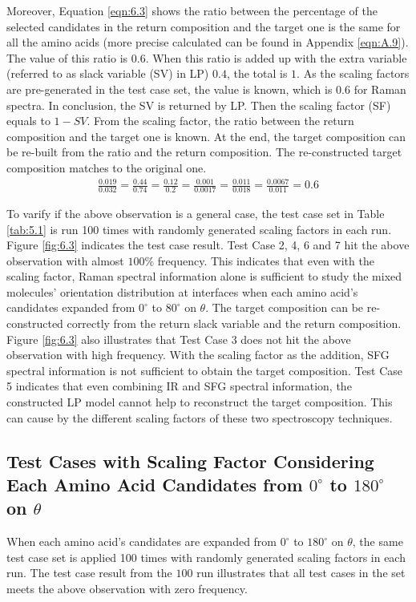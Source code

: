 Moreover, Equation \ref{eqn:6.3} shows the ratio between the percentage of the selected candidates in the return composition and the target one is the same for all the amino acids (more precise calculated can be found in Appendix \ref{eqn:A.9}). The value of this ratio is $0.6$. When this ratio is added up with the extra variable (referred to as slack variable (SV) in LP) $0.4$, the total is $1$. As the scaling factors are pre-generated in the test case set, the value is known, which is $0.6$ for Raman spectra. In conclusion, the SV is returned by LP. Then the scaling factor (SF) equals to $1 - SV$. From the scaling factor, the ratio between the return composition and the target one is known. At the end, the target composition can be re-built from the ratio and the return composition. The re-constructed target composition matches to the original one. \\

\begin{eqnarray} \label{eqn:6.3}
\frac{0.019}{0.032} = \frac{0.44}{0.74} = \frac{0.12}{0.2} =\frac{0.001}{0.0017}  = \frac{0.011}{0.018} = \frac{0.0067}{0.011} = 0.6
\end{eqnarray}

To varify if the above observation is a general case, the test case set in Table \ref{tab:5.1} is run 100 times with randomly generated scaling factors in each run. Figure \ref{fig:6.3} indicates the test case result. Test Case 2, 4, 6 and 7 hit the above observation with almost $100\%$ frequency. This indicates that even with the scaling factor, Raman spectral information alone is sufficient to study the mixed molecules' orientation distribution at interfaces when each amino acid's candidates expanded from $0^{\circ}$ to $80^{\circ}$ on $\theta$. The target composition can be re-constructed correctly from the return slack variable and the return composition. Figure \ref{fig:6.3} also illustrates that Test Case 3 does not hit the above observation with high frequency. With the scaling factor as the addition, SFG spectral information is not sufficient to obtain the target composition. Test Case 5 indicates that even combining IR and SFG spectral information, the constructed LP model cannot help to reconstruct the target composition. This can cause by the different scaling factors of these two spectroscopy techniques. \\

\subsection{Test Cases with Scaling Factor Considering Each Amino Acid Candidates from $0^{\circ}$ to $180^{\circ}$ on $\theta$}
When each amino acid's candidates are expanded from $0^{\circ}$ to $180^{\circ}$ on $\theta$, the same test case set is applied 100 times with randomly generated scaling factors in each run. The test case result from the $100$ run illustrates that all test cases in the set meets the above observation with zero frequency. \\

